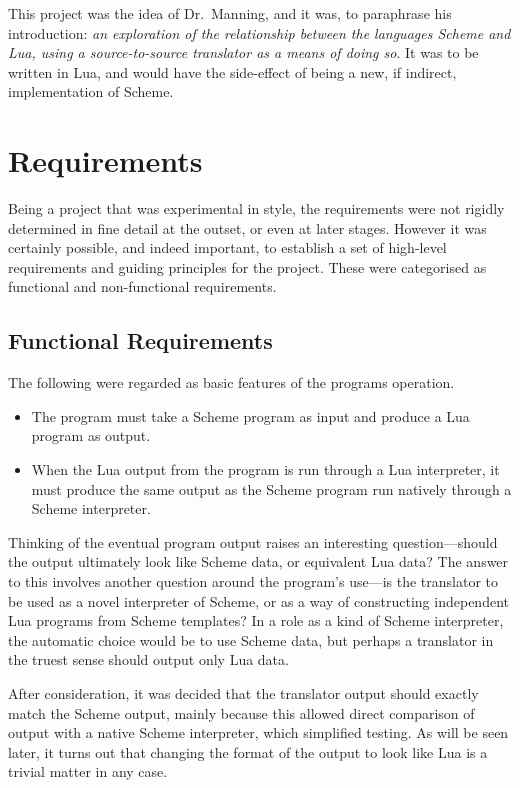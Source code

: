 This project was the idea of Dr.\ Manning, and it was, to paraphrase his
introduction: {\em an exploration of the relationship between
the languages Scheme and Lua, using a source-to-source translator as a means of
doing so}. It was to be written in Lua, and would have the side-effect of being
a new, if indirect, implementation of Scheme.


\section{Requirements}

Being a project that was experimental in style, the requirements were not
rigidly determined in fine detail at the outset, or even at later stages.
However it was certainly possible, and indeed important, to establish a set of
high-level requirements and guiding principles for the project. These were
categorised as functional and non-functional requirements.

\subsection{Functional Requirements}

The following were regarded as basic features of the programs operation.
\begin{itemize}
\item The program must take a Scheme program as input and produce a Lua program
as output.
\item When the Lua output from the program is run through a Lua interpreter, it
must produce the same output as the Scheme program run natively through a Scheme
interpreter.
\end{itemize}
\begin{framed}
Thinking of the eventual program output raises an interesting question---should
the output ultimately look like Scheme data, or equivalent Lua data?  The answer
to this involves another question around the program's use---is the translator
to be used as a novel interpreter of Scheme, or as a way of constructing
independent Lua programs from Scheme templates? In a role as a kind of Scheme
interpreter, the automatic choice would be to use Scheme data, but perhaps a
translator in the truest sense should output only Lua data.

After consideration, it was decided that the translator output should exactly
match the Scheme output, mainly because this allowed direct comparison of output
with a native Scheme interpreter, which simplified testing. As will be seen
later, it turns out that changing the format of the output to look like Lua is a
trivial matter in any case.
\end{framed}

